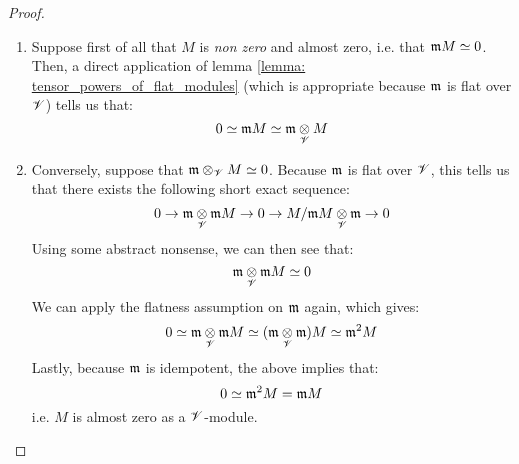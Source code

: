                 \begin{proof}
                    \noindent
                    \begin{enumerate}
                        \item Suppose first of all that $M$ is \textit{non zero} and almost zero, i.e. that $\mathfrak{m} M \simeq 0$. Then, a direct application of lemma \ref{lemma: tensor_powers_of_flat_modules} (which is appropriate because $\mathfrak{m}$ is flat over $\mathscr{V}$) tells us that:
                            $$0 \cong \m M \cong \m \tensor_{\scrV} M$$
                        \item Conversely, suppose that $\m \tensor_{\scrV} M \cong 0$. Because $\mathfrak{m}$ is flat over $\mathscr{V}$, this tells us that there exists the following short exact sequence:
                            $$0 \to \m \tensor_{\scrV} \m M \to 0 \to M/\m M \tensor_{\scrV} \m \to 0$$
                        Using some abstract nonsense, we can then see that:
                            $$\m \tensor_{\scrV} \m M \cong 0$$
                        We can apply the flatness assumption on $\mathfrak{m}$ again, which gives:
                            $$0 \cong \m \tensor_{\scrV} \m M \cong (\m \tensor_{\scrV} \m) M \cong \m^2 M$$
                        Lastly, because $\mathfrak{m}$ is idempotent, the above implies that:
                            $$0 \simeq \mathfrak{m}^2 M = \mathfrak{m} M$$
                        i.e. $M$ is almost zero as a $\mathscr{V}$-module.
                    \end{enumerate}
                \end{proof}
                
